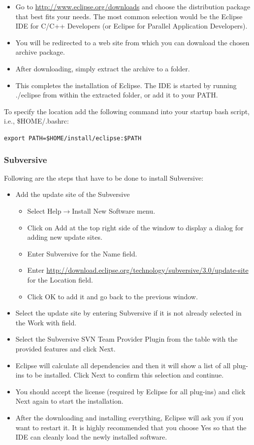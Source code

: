 \documentclass[11pt,a4paper, oneside]{book} %
\newcommand{\eclipseurl}{\url{http://www.eclipse.org/downloads} }
\newcommand{\subversiveurl}{\url{http://download.eclipse.org/technology/subversive/3.0/update-site} }
\newcommand{\installloc}[1]{\$HOME/install/#1}
\newcommand{\eclipseplugin}[3]{
Following are the steps that have to be done to install #1:
 \begin{itemize}
  \item Add the update site of the #1
  \begin{itemize}
   \item Select Help$\rightarrow$Install New Software menu.
   \item Click on Add at the top right side of the window to display a dialog
for adding new update sites.
  \item Enter #1 for the Name field.
  \item Enter #2 for the Location field.
  \item Click OK to add it and go back to the previous window.
  \end{itemize}
  \item Select the update site by entering #1 if it is not already selected in
the Work with field.
  \item Select the #3 from the table with the provided
features and click Next.
  \item Eclipse will calculate all dependencies and then it will show a list of
all plug-ins to be installed. Click Next to confirm this selection and continue.
  \item You should accept the license (required by Eclipse for all plug-ins) and
click Next again to start the installation.
  \item After the downloading and installing everything, Eclipse will ask you if
you want to restart it. It is highly recommended that you choose Yes so that the
IDE can cleanly load the newly installed software.
 \end{itemize}

}
\begin{document}
 \begin{itemize}
  \item Go to \eclipseurl and choose the distribution package that best fits
your needs. The most common selection would be the Eclipse IDE for C/C++
Developers (or Eclipse for Parallel Application Developers).
  \item You will be redirected to a web site from which you can download the
chosen archive package.

  \item After downloading, simply extract the archive to a folder.
  \item This completes the installation of Eclipse. The IDE is started by
running ./eclipse from within the extracted folder, or add it to your PATH.
 \end{itemize}

To specify the location add the following command into your startup bash script,
i.e., \$HOME/.bashrc:

\texttt{export PATH=\installloc{eclipse}:\$PATH}
\subsubsection{Subversive}

\eclipseplugin{Subversive}{\subversiveurl}{Subversive SVN Team Provider Plugin}

\end{document}
